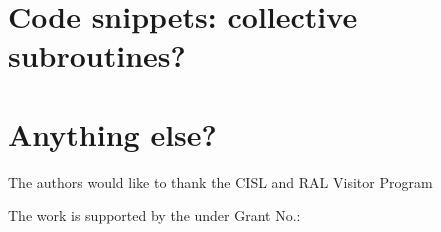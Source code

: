 
%




\appendix
\section{Code snippets: collective subroutines?}
\section{Anything else?}

\begin{acks}
  The authors would like to thank the CISL and RAL Visitor Program

  The work is
  supported by the  under Grant
  No.:~

\end{acks}
